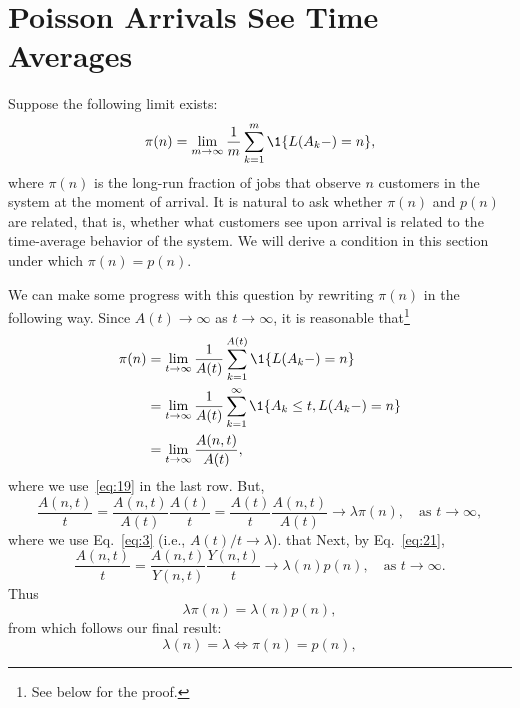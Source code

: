 \section{Poisson Arrivals See Time Averages}
\label{sec:poisson-arrivals-see}

Suppose the following limit exists:
\begin{equation*}
  \pi(n) 
= \lim_{m\to\infty} 
\frac1m\sum_{k=1}^m \1{L(A_k-) = n},
\end{equation*}
where $\pi(n)$ is the long-run fraction of jobs that observe $n$
customers in the system at the moment of arrival.  It is natural to
ask whether $\pi(n)$ and $p(n)$ are related, that is, whether what
customers see upon arrival is related to the time-average behavior of
the system. We will derive a condition in this section under which
$\pi(n)=p(n)$. 


We can make some progress with this question by rewriting $\pi(n)$ in
the following way. Since $A(t)\to \infty$ as $t\to\infty$, it is reasonable 
that\footnote{See below for the proof.}
\begin{equation}\label{eq:132}
  \begin{split}
  \pi(n) &= \lim_{t\to\infty} \frac1{A(t)}\sum_{k=1}^{A(t)} \1{L(A_k-) = n} \\
  &= \lim_{t\to\infty} \frac1{A(t)}\sum_{k=1}^\infty \1{A_k \leq t, L(A_k-) = n} \\
  &= \lim_{t\to\infty} \frac{A(n,t)}{A(t)},
  \end{split}
\end{equation}
where we use~\eqref{eq:19} in the last row. But, 
\begin{equation}\label{eq:1333}
 \frac{A(n,t)}{t} 
=   \frac{A(n,t)}{A(t)} \frac{A(t)}t 
= \frac{A(t)}t \frac{A(n,t)}{A(t)}
\to \lambda  \pi(n), \quad\text{as } t \to \infty, 
\end{equation}
where we use Eq.~\eqref{eq:3} (i.e., $A(t)/t \to \lambda$). that
Next, by  Eq.~\eqref{eq:21}, 
\begin{equation*}
\frac{A(n,t)}t = \frac{A(n,t)}{Y(n,t)}\frac{Y(n,t)}t \to \lambda(n) p(n), \quad\text{as } t \to \infty.
\end{equation*}
Thus
\begin{equation}\label{eq:13}
\lambda  \pi(n) = \lambda(n) p(n), 
\end{equation}
from which  follows our final result:
\begin{equation*}
  \lambda(n) = \lambda \iff \pi(n) = p(n), 
\end{equation*}

